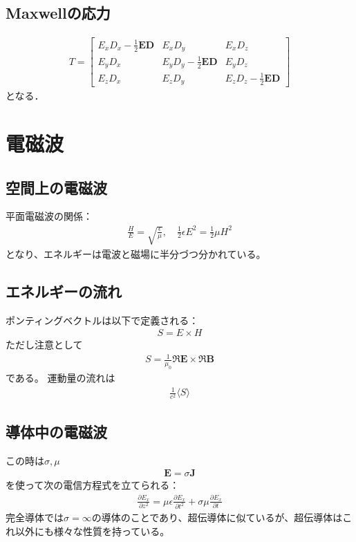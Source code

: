 \documentclass[12pt,dvipdfmx]{jsarticle}
\begin{document}
\subsection*{Maxwellの応力}
\begin{eqnarray}
  T = 
  \begin{bmatrix}
    E_x D_x -\frac{1}{2}\bm{E}\bm{D} & E_x D_y & E_x D_z\\
    E_y D_x  & E_y D_y -\frac{1}{2}\bm{E}\bm{D}  & E_y D_z\\
    E_z D_x  & E_z D_y & E_z D_z -\frac{1}{2}\bm{E}\bm{D}
  \end{bmatrix}
\end{eqnarray}
となる．
\section*{\Large{電磁波}}
\subsection*{空間上の電磁波}
平面電磁波の関係：
\begin{eqnarray}
  \frac{H}{E}= \sqrt{\frac{\epsilon}{\mu}},\quad \frac{1}{2}\epsilon E^2 = \frac{1}{2}\mu H^2
\end{eqnarray}
となり、エネルギーは電波と磁場に半分づつ分かれている。
\subsection*{エネルギーの流れ}
ポンティングベクトルは以下で定義される：
\begin{eqnarray}
  S = E\times H
\end{eqnarray}
ただし注意として
\begin{eqnarray}
  S = \frac{1}{\mu_0}\Re\bm{E}\times\Re\bm{B}
\end{eqnarray}
である。
運動量の流れは
\begin{eqnarray}
  \frac{1}{c^2}\langle S \rangle
\end{eqnarray}
\subsection*{導体中の電磁波}
この時は$\sigma,\mu$
\begin{eqnarray}
  \bm{E} = \sigma \bm{J}
\end{eqnarray}
を使って次の電信方程式を立てられる：
\begin{eqnarray}
  \frac{\partial E_x}{\partial z^2} = \mu\epsilon\frac{\partial E_x}{\partial t^2} + \sigma\mu\frac{\partial E_x}{\partial t}
\end{eqnarray}
完全導体では$\sigma=\infty$の導体のことであり、超伝導体に似ているが、超伝導体はこれ以外にも様々な性質を持っている。
\end{document}
